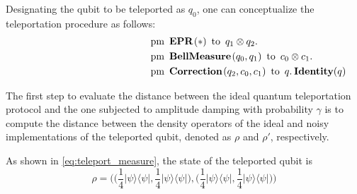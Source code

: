 Designating the qubit to be teleported as $q_0$, one can conceptualize the teleportation procedure as follows:
\begin{equation}
  \begin{split}
    \hspace{130 pt}& \text{pm} \hspace{5pt} \textbf{EPR}\hspace{1pt} (*) \hspace{5pt} \text{to} \hspace{5pt}  q_{1} \otimes q_{2}.  \notag \\
    & \text{pm}\hspace{5pt} \textbf{BellMeasure} \hspace{1pt} (q_0,q_{1}) \hspace{5pt}  \text{to} \hspace{5pt} c_{0}\otimes c_{1} . \notag \\
    & \text{pm} \hspace{5pt}  \textbf{Correction} \hspace{1pt} ( q_{2},  c_{0}, c_{1} ) \hspace{5pt} \text{to} \hspace{5pt}  q. \hspace{2pt}  \textbf{Identity}(q)
  \end{split}
\end{equation}

The first step to evaluate the distance between the ideal quantum teleportation protocol and the one subjected to amplitude damping with probability $\gamma$ is to compute the distance between the density operators of the ideal and noisy implementations of the teleported qubit, denoted as $\rho$ and $\rho'$, respectively.

As shown in \autoref{eq:teleport_measure}, the state of the teleported qubit is 
\begin{equation*}
  \rho = \Big(\Big(\frac{1}{4} |\psi\rangle \langle \psi|, \frac{1}{4} |\psi\rangle \langle \psi|\Big),(\frac{1}{4} |\psi\rangle \langle \psi|, \frac{1}{4}  |\psi\rangle \langle \psi| \Big)\Big)
\end{equation*}

